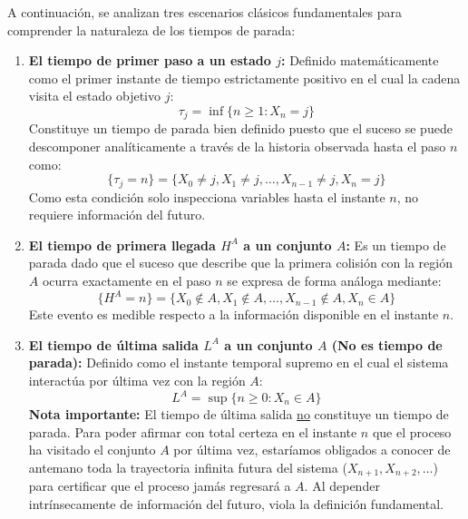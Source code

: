 \begin{ejemplo}
    A continuación, se analizan tres escenarios clásicos fundamentales para comprender la naturaleza de los tiempos de parada:

    \begin{enumerate}
        \item \textbf{El tiempo de primer paso a un estado $j$:} 
        Definido matemáticamente como el primer instante de tiempo estrictamente positivo en el cual la cadena visita el estado objetivo $j$:
        \[ 
        \tau_j = \inf\{n \geq 1 : X_n = j\} 
        \]
        Constituye un tiempo de parada bien definido puesto que el suceso se puede descomponer analíticamente a través de la historia observada hasta el paso $n$ como:
        \[ 
        \{ \tau_j = n \} = \{ X_0 \neq j, X_1 \neq j, \dots, X_{n-1} \neq j, X_n = j \} 
        \]
        Como esta condición solo inspecciona variables hasta el instante $n$, no requiere información del futuro.

        \item \textbf{El tiempo de primera llegada $H^A$ a un conjunto $A$:}
        Es un tiempo de parada dado que el suceso que describe que la primera colisión con la región $A$ ocurra exactamente en el paso $n$ se expresa de forma análoga mediante:
        \[ 
        \{ H^A = n \} = \{ X_0 \notin A, X_1 \notin A, \dots, X_{n-1} \notin A, X_n \in A \} 
        \]
        Este evento es medible respecto a la información disponible en el instante $n$.

        \item \textbf{El tiempo de última salida $L^A$ a un conjunto $A$ (No es tiempo de parada):}
        Definido como el instante temporal supremo en el cual el sistema interactúa por última vez con la región $A$:
        \[ 
        L^A = \sup\{n \geq 0 : X_n \in A\} 
        \]
        \textbf{Nota importante:} El tiempo de última salida \underline{no} constituye un tiempo de parada. Para poder afirmar con total certeza en el instante $n$ que el proceso ha visitado el conjunto $A$ por última vez, estaríamos obligados a conocer de antemano toda la trayectoria infinita futura del sistema ($X_{n+1}, X_{n+2}, \dots$) para certificar que el proceso jamás regresará a $A$. Al depender intrínsecamente de información del futuro, viola la definición fundamental.
    \end{enumerate}
\end{ejemplo}


